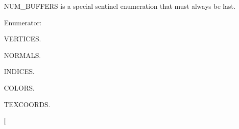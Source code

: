 N\-U\-M\-\_\-\-B\-U\-F\-F\-E\-R\-S is a special sentinel enumeration that must always be last. \begin{Desc}
\item[Enumerator\-: ]\par
\begin{description}
\item[{\em 
\hypertarget{class_object_a51d08da3bd559d08734197006bc29a79a23be05de1d4a9e5738eff4c1860f8bfd}{V\-E\-R\-T\-I\-C\-E\-S}\label{class_object_a51d08da3bd559d08734197006bc29a79a23be05de1d4a9e5738eff4c1860f8bfd}
}]V\-E\-R\-T\-I\-C\-E\-S. \item[{\em 
\hypertarget{class_object_a51d08da3bd559d08734197006bc29a79ac91e7a2ef76150b999a9af53d229a8e0}{N\-O\-R\-M\-A\-L\-S}\label{class_object_a51d08da3bd559d08734197006bc29a79ac91e7a2ef76150b999a9af53d229a8e0}
}]N\-O\-R\-M\-A\-L\-S. \item[{\em 
\hypertarget{class_object_a51d08da3bd559d08734197006bc29a79abe6f0cf968db450f99d8e176c4d23091}{I\-N\-D\-I\-C\-E\-S}\label{class_object_a51d08da3bd559d08734197006bc29a79abe6f0cf968db450f99d8e176c4d23091}
}]I\-N\-D\-I\-C\-E\-S. \item[{\em 
\hypertarget{class_object_a51d08da3bd559d08734197006bc29a79a69fb14c98b43d636b30ef5e77b492968}{C\-O\-L\-O\-R\-S}\label{class_object_a51d08da3bd559d08734197006bc29a79a69fb14c98b43d636b30ef5e77b492968}
}]C\-O\-L\-O\-R\-S. \item[{\em 
\hypertarget{class_object_a51d08da3bd559d08734197006bc29a79adc601b2ac4ff7f3e455faa35208e431f}{T\-E\-X\-C\-O\-O\-R\-D\-S}\label{class_object_a51d08da3bd559d08734197006bc29a79adc601b2ac4ff7f3e455faa35208e431f}
}]T\-E\-X\-C\-O\-O\-R\-D\-S. \item[{\em 
}
\end{description}
\end{Desc}

